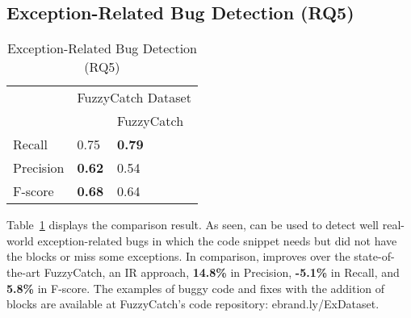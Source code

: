 \subsection{Exception-Related Bug Detection (RQ5)}
\label{sec:rq1}

\begin{table}[t]%
  \caption {Exception-Related Bug Detection (RQ5)}
  \vspace{-12pt}
  \small
	\begin{center}
		\renewcommand{\arraystretch}{1}
		\begin{tabular}{|p{1.75cm}<{\centering}|p{1.75cm}<{\centering}|p{1.75cm}<{\centering}|}
		  \hline
			\multirow{2}{*}{} & \multicolumn{2}{c|}{FuzzyCatch Dataset} \\
			\cline{2-3}
			  & \tool  & FuzzyCatch~\cite{xrank-fse20} \\
			\hline
			Recall    & 0.75 & \textbf{0.79}\\
			Precision & \textbf{0.62} & 0.54\\
			F-score   & \textbf{0.68} & 0.64\\
			\hline
		\end{tabular}
		\label{tab:bug}
	\end{center}
\end{table}


Table~\ref{tab:bug} displays the comparison result. As seen, {\tool}
can be used to detect well real-world exception-related bugs in which
the code snippet needs but did not have the  blocks or
miss some exceptions. In comparison, {\tool} improves over the
state-of-the-art FuzzyCatch, an IR approach, {\bf 14.8\%} in Precision,
{\bf -5.1\%} in Recall, and {\bf 5.8\%} in F-score. The examples of buggy
code and fixes with the addition of  blocks are
available at FuzzyCatch's code repository: ebrand.ly/ExDataset.
